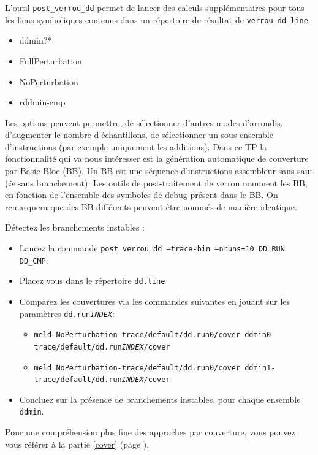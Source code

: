 \documentclass[a4paper]{article}
\newcounter{Question}
\newenvironment{question}[1][\unskip]{
  \bigskip
  \stepcounter{Question}
  \def\questionTitle{ #1}
  \begin{mdframed}[style=question]
  }{
  \end{mdframed}
}
\newenvironment{warn}[1][Attention :]{
  \begin{mdframed}[style=warning]
    \noindent{\bf #1}
}{
  \end{mdframed}
}
\begin{document}
L'outil \texttt{post\_verrou\_dd} permet de lancer des calculs supplémentaires pour tous les
liens symboliques contenus dans un répertoire de résultat de \texttt{verrou\_dd\_line} :
\begin{itemize}
\item ddmin?*
\item FullPerturbation
\item NoPerturbation
\item rddmin-cmp
\end{itemize}
Les options peuvent permettre, de sélectionner d'autres modes
d'arrondis, d'augmenter le nombre d'échantillons, de sélectionner un
sous-ensemble d'instructions (par exemple uniquement les
additions). Dans ce TP la fonctionnalité qui va nous intéresser 
est la génération automatique de couverture par Basic Bloc (BB). Un BB
est une séquence d'instructions assembleur sans saut (\textit{ie} sans
branchement). Les outils de
post-traitement de verrou nomment les BB, en fonction de l'ensemble des
symboles de debug présent dans le BB. On remarquera que des BB
différents peuvent être nommés de manière identique. 

\begin{question}
  Détectez les branchements instables :
  \begin{itemize}
  \item Lancez la commande \texttt{post\_verrou\_dd --trace-bin --nruns=10 DD\_RUN DD\_CMP}.
  \item Placez vous dans le répertoire \texttt{dd.line}
  \item Comparez les couvertures via les commandes suivantes en jouant
    sur les paramètres \texttt{dd.run\textit{INDEX}}: 
    \begin{itemize}
      \item \texttt{meld NoPerturbation-trace/default/dd.run0/cover ddmin0-trace/default/dd.run\textit{INDEX}/cover}
      \item \texttt{meld NoPerturbation-trace/default/dd.run0/cover ddmin1-trace/default/dd.run\textit{INDEX}/cover}
    \end{itemize}
  \item Concluez sur la présence de branchements instables, pour
    chaque ensemble \texttt{ddmin}.
  \end{itemize}
\end{question}

\begin{warn}
Pour une compréhension plus fine des approches par couverture, vous
pouvez vous référer à la partie \ref{cover} (page \pageref{cover}).  
\end{warn}
\end{document}
